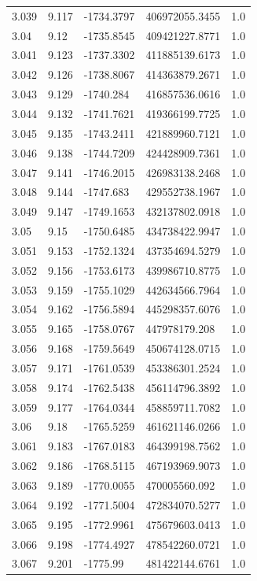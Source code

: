 \begin{tabular}{lllll}
3.039 & 9.117 & -1734.3797 & 406972055.3455 & 1.0 \\
3.04 & 9.12 & -1735.8545 & 409421227.8771 & 1.0 \\
3.041 & 9.123 & -1737.3302 & 411885139.6173 & 1.0 \\
3.042 & 9.126 & -1738.8067 & 414363879.2671 & 1.0 \\
3.043 & 9.129 & -1740.284 & 416857536.0616 & 1.0 \\
3.044 & 9.132 & -1741.7621 & 419366199.7725 & 1.0 \\
3.045 & 9.135 & -1743.2411 & 421889960.7121 & 1.0 \\
3.046 & 9.138 & -1744.7209 & 424428909.7361 & 1.0 \\
3.047 & 9.141 & -1746.2015 & 426983138.2468 & 1.0 \\
3.048 & 9.144 & -1747.683 & 429552738.1967 & 1.0 \\
3.049 & 9.147 & -1749.1653 & 432137802.0918 & 1.0 \\
3.05 & 9.15 & -1750.6485 & 434738422.9947 & 1.0 \\
3.051 & 9.153 & -1752.1324 & 437354694.5279 & 1.0 \\
3.052 & 9.156 & -1753.6173 & 439986710.8775 & 1.0 \\
3.053 & 9.159 & -1755.1029 & 442634566.7964 & 1.0 \\
3.054 & 9.162 & -1756.5894 & 445298357.6076 & 1.0 \\
3.055 & 9.165 & -1758.0767 & 447978179.208 & 1.0 \\
3.056 & 9.168 & -1759.5649 & 450674128.0715 & 1.0 \\
3.057 & 9.171 & -1761.0539 & 453386301.2524 & 1.0 \\
3.058 & 9.174 & -1762.5438 & 456114796.3892 & 1.0 \\
3.059 & 9.177 & -1764.0344 & 458859711.7082 & 1.0 \\
3.06 & 9.18 & -1765.5259 & 461621146.0266 & 1.0 \\
3.061 & 9.183 & -1767.0183 & 464399198.7562 & 1.0 \\
3.062 & 9.186 & -1768.5115 & 467193969.9073 & 1.0 \\
3.063 & 9.189 & -1770.0055 & 470005560.092 & 1.0 \\
3.064 & 9.192 & -1771.5004 & 472834070.5277 & 1.0 \\
3.065 & 9.195 & -1772.9961 & 475679603.0413 & 1.0 \\
3.066 & 9.198 & -1774.4927 & 478542260.0721 & 1.0 \\
3.067 & 9.201 & -1775.99 & 481422144.6761 & 1.0 \\

\end{tabular}

